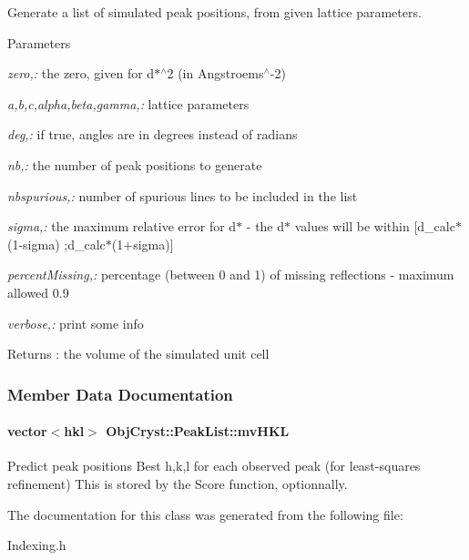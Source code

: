 Generate a list of simulated peak positions, from given lattice parameters. 
\begin{DoxyParams}{Parameters}
\item[{\em zero,:}]the zero, given for d$\ast$$^\wedge$2 (in Angstroems$^\wedge$-\/2) \item[{\em a,b,c,alpha,beta,gamma,:}]lattice parameters \item[{\em deg,:}]if true, angles are in degrees instead of radians \item[{\em nb,:}]the number of peak positions to generate \item[{\em nbspurious,:}]number of spurious lines to be included in the list \item[{\em sigma,:}]the maximum relative error for d$\ast$ -\/ the d$\ast$ values will be within [d\_\-calc$\ast$(1-\/sigma) ;d\_\-calc$\ast$(1+sigma)] \item[{\em percentMissing,:}]percentage (between 0 and 1) of missing reflections -\/ maximum allowed 0.9 \item[{\em verbose,:}]print some info \end{DoxyParams}
\begin{DoxyReturn}{Returns}
: the volume of the simulated unit cell 
\end{DoxyReturn}


\subsubsection{Member Data Documentation}
\paragraph[{mvHKL}]{\setlength{\rightskip}{0pt plus 5cm}vector$<${\bf hkl}$>$ {\bf ObjCryst::PeakList::mvHKL}\hspace{0.3cm}{\ttfamily  [mutable]}}\hfill\label{a00059_a810ed3eb6c76a08488ace8b530529631}


Predict peak positions Best h,k,l for each observed peak (for least-\/squares refinement) This is stored by the Score function, optionnally. 

The documentation for this class was generated from the following file:\begin{DoxyCompactItemize}
\item 
Indexing.h\end{DoxyCompactItemize}
